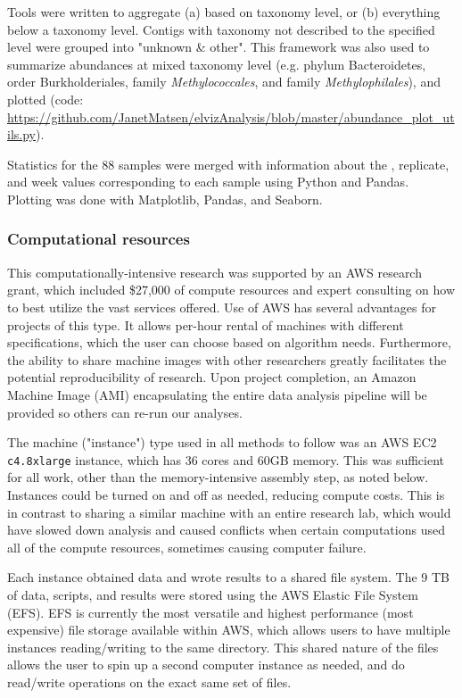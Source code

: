 Tools were written to aggregate (a) based on taxonomy level, or (b) everything below a taxonomy level.
Contigs with taxonomy not described to the specified level were grouped into "unknown \& other".
This framework was also used to summarize abundances at mixed taxonomy level (e.g. phylum Bacteroidetes, order Burkholderiales, family \textit{Methylococcales}, and family \textit{Methylophilales}), and plotted (code: \url{https://github.com/JanetMatsen/elvizAnalysis/blob/master/abundance_plot_utils.py}).

Statistics for the 88 samples were merged with information about the , replicate, and week values corresponding to each sample using Python and Pandas.
Plotting was done with Matplotlib, Pandas, and Seaborn.

\subsubsection{Computational resources}   %
This computationally-intensive research was supported by an AWS research grant, which included \$27,000 of compute resources and expert consulting on how to best utilize the vast services offered.
Use of AWS has several advantages for projects of this type.
It allows per-hour rental of machines with different specifications, which the user can choose based on algorithm needs.
Furthermore, the ability to share machine images with other researchers greatly facilitates the potential reproducibility of research.
Upon project completion, an Amazon Machine Image (AMI) encapsulating the entire data analysis pipeline will be provided so others can re-run our analyses.

The machine ("instance") type used in all methods to follow was an AWS EC2 \texttt{c4.8xlarge} instance, which has 36 cores and 60GB memory.
This was sufficient for all work, other than the memory-intensive assembly step, as noted below.
Instances could be turned on and off as needed, reducing compute costs.
This is in contrast to sharing a similar machine with an entire research lab, which would have slowed down analysis and caused conflicts when certain computations used all of the compute resources, sometimes causing computer failure.

Each instance obtained data and wrote results to a shared file system.
The 9 TB of data, scripts, and results were stored using the AWS Elastic File System (EFS).
EFS is currently the most versatile and highest performance (most expensive) file storage available within AWS, which allows users to have multiple instances reading/writing to the same directory.
This shared nature of the files allows the user to spin up a second computer instance as needed, and do read/write operations on the exact same set of files.

